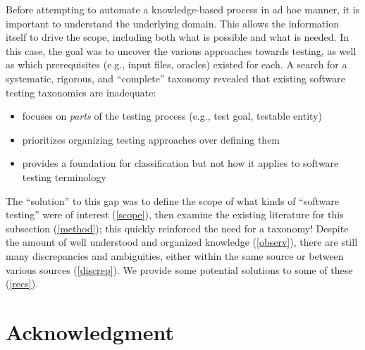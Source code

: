 \documentclass[conference]{IEEEtran}
\begin{document}
Before attempting to automate a knowledge-based process in ad hoc manner, it is
important to understand the underlying domain. This allows the information
itself to drive the scope, including both what is possible and what is needed.
In this case, the goal was to uncover the various approaches towards testing,
as well as which prerequisites (e.g., input files, oracles) existed for each.
A search for a systematic, rigorous, and ``complete'' taxonomy revealed that
existing software testing taxonomies are inadequate:

\begin{itemize}
    \item \cite{TebesEtAl2020a} focuses on \emph{parts} of the
          testing process (e.g., test goal, testable entity)
    \item \cite{SouzaEtAl2017} prioritizes organizing testing
          approaches over defining them
    \item \cite{UnterkalmsteinerEtAl2014} provides a foundation for
          classification but not how it applies to software testing terminology
\end{itemize}

The ``solution'' to this gap was to define the scope of what kinds of
``software testing'' were of interest (\ref{scope}), then examine the existing
literature for this subsection (\ref{method}); this
quickly reinforced the need for a taxonomy! Despite the amount of
well understood and organized knowledge (\ref{observ}), there are still many
discrepancies and ambiguities, either within the same source or between various
sources (\ref{discrep}). We provide some potential solutions to some of these
(\ref{recs}).







\section*{Acknowledgment}


\newpage



\end{document}
